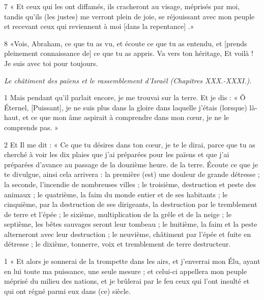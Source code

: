 \par 7 « Et ceux qui les ont diffamés, ils cracheront au visage, méprisés par moi, tandis qu'ils (les justes) me verront plein de joie, se réjouissant avec mon peuple et recevant ceux qui reviennent à moi [dans la repentance] .»

\par 8 «Vois, Abraham, ce que tu as vu, et écoute ce que tu as entendu, et [prends pleinement connaissance de] ce que tu as appris. Va vers ton héritage, Et voilà ! Je suis avec toi pour toujours.


\par \textit{Le châtiment des païens et le rassemblement d'Israël (Chapitres XXX.-XXXI.).}

\par 1 Mais pendant qu'il parlait encore, je me trouvai sur la terre. Et je dis : « Ô Éternel, [Puissant], je ne suis plus dans la gloire dans laquelle j’étais (lorsque) là-haut, et ce que mon âme aspirait à comprendre dans mon cœur, je ne le comprends pas. »

\par 2 Et Il me dit : « Ce que tu désires dans ton cœur, je te le dirai, parce que tu as cherché à voir les dix plaies que j'ai préparées pour les païens et que j'ai préparées d'avance au passage de la douzième heure. de la terre. Écoute ce que je te divulgue, ainsi cela arrivera : la première (est) une douleur de grande détresse ; la seconde, l'incendie de nombreuses villes ; le troisième, destruction et peste des animaux ; le quatrième, la faim du monde entier et de ses habitants ; le cinquième, par la destruction de ses dirigeants, la destruction par le tremblement de terre et l'épée ; le sixième, multiplication de la grêle et de la neige ; le septième, les bêtes sauvages seront leur tombeau ; le huitième, la faim et la peste alterneront avec leur destruction ; le neuvième, châtiment par l'épée et fuite en détresse ; le dixième, tonnerre, voix et tremblement de terre destructeur.


\par 1 « Et alors je sonnerai de la trompette dans les airs, et j'enverrai mon Élu, ayant en lui toute ma puissance, une seule mesure ; et celui-ci appellera mon peuple méprisé du milieu des nations, et je brûlerai par le feu ceux qui l'ont insulté et qui ont régné parmi eux dans (ce) siècle.

